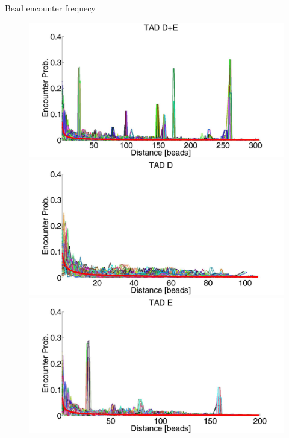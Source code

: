 \documentclass[8pt]{beamer}
\begin{document}
\begin{frame}{Bead encounter frequecy}
\begin{figure}[H]\label{TADDAndEencounterProb}
\centering
\includegraphics[scale=0.078]{encounterProbabilityTADDAndE}
\includegraphics[scale=0.075]{encounterProbabilityTADD}
\includegraphics[scale=0.075]{encounterProbabilityTADE}
\end{figure}
\end{frame}
\end{document}
